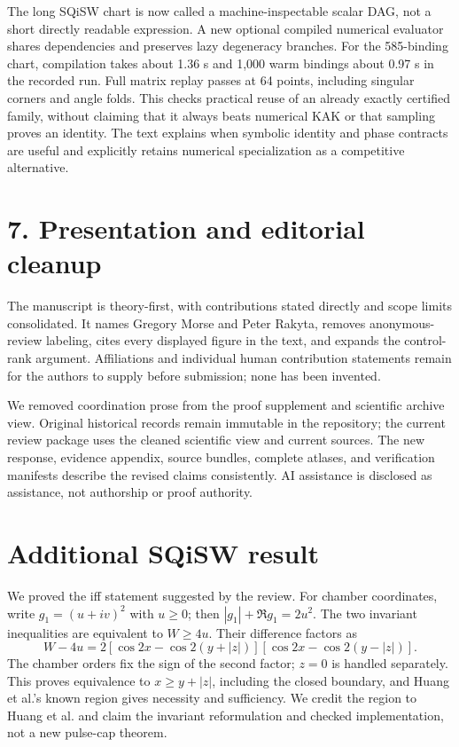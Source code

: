 \documentclass[11pt]{article}
\begin{document}
The long SQiSW chart is now called a machine-inspectable scalar DAG, not a
short directly readable expression. A new optional compiled numerical
evaluator shares dependencies and preserves lazy degeneracy branches.
For the 585-binding chart, compilation takes about 1.36 s and 1,000 warm
bindings about 0.97 s in the recorded run. Full matrix replay passes at 64
points, including singular corners and angle folds. This checks practical
reuse of an already exactly certified family, without claiming that it always
beats numerical KAK or that sampling proves an identity. The text explains
when symbolic identity and phase contracts are useful and explicitly retains
numerical specialization as a competitive alternative.

\section*{7. Presentation and editorial cleanup}
The manuscript is theory-first, with contributions stated directly and
scope limits consolidated. It names Gregory Morse and Peter Rakyta, removes
anonymous-review labeling, cites every displayed figure in the text, and
expands the control-rank argument. Affiliations and individual human
contribution statements remain for the authors to supply before submission;
none has been invented.

We removed coordination prose from the proof supplement and scientific
archive view. Original historical records remain immutable in the repository;
the current review package uses the cleaned scientific view and current
sources. The new response, evidence appendix, source bundles, complete
atlases, and verification manifests describe the revised claims consistently.
AI assistance is disclosed as assistance, not authorship or proof authority.

\section*{Additional SQiSW result}
We proved the iff statement suggested by the review. For chamber coordinates,
write $g_1=(u+iv)^2$ with $u\ge0$; then $|g_1|+\Re g_1=2u^2$. The two
invariant inequalities are equivalent to $W\ge4u$. Their difference factors
as
\[
 W-4u=2[\cos2x-\cos2(y+|z|)]
          [\cos2x-\cos2(y-|z|)].
\]
The chamber orders fix the sign of the second factor; $z=0$ is handled
separately. This proves equivalence to $x\ge y+|z|$, including the closed
boundary, and Huang et al.'s known region gives necessity and sufficiency.
We credit the region to Huang et al. and claim the invariant reformulation
and checked implementation, not a new pulse-cap theorem.
\end{document}

